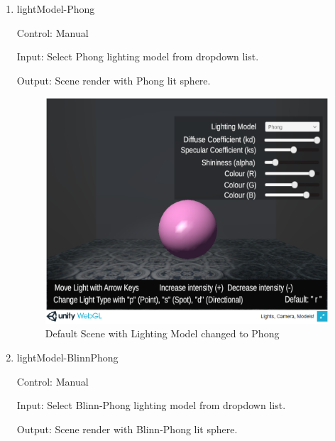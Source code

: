 \documentclass[12pt, titlepage]{article}
\begin{document}
\begin{enumerate}
	\item{lightModel-Phong\\}
	
	Control: Manual
	
	Input: Select Phong lighting model from dropdown list. 
	
	Output: Scene render with Phong lit sphere.
	
	\begin{figure}[h]
		\centering
		\includegraphics[scale=0.25]{./images/fromVnVPlan/sphere-lit-phong}
		\caption{Default Scene with Lighting Model changed to Phong}
		\label{fig:Phong}
	\end{figure}
	

	\item{lightModel-BlinnPhong\\}
	
	Control: Manual
	
	Input: Select Blinn-Phong lighting model from dropdown list. 
	
	Output: Scene render with Blinn-Phong lit sphere.
	

\end{enumerate}
\end{document}

